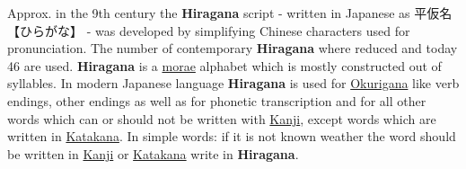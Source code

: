 Approx. in the 9th century the \textbf{Hiragana} script - written in Japanese
as {平仮名} {【ひらがな】} - was developed by simplifying Chinese characters
used for pronunciation. The number of contemporary \textbf{Hiragana} where
reduced and today 46 are used.  \textbf{Hiragana} is a
\hyperref[sec:Mora]{morae} alphabet which is mostly constructed out of
syllables. In modern Japanese language \textbf{Hiragana} is used for
\hyperref[sec:Okurigana]{Okurigana} like  verb endings, other endings as well
as for phonetic transcription and for all other words which can or should not
be written with \hyperref[sec:Kanji]{Kanji}, except words which are written in
\hyperref[sec:Katakana]{Katakana}. In simple words: if it is not known weather
the word should be written in \hyperref[sec:Kanji]{Kanji} or
\hyperref[sec:Katakana]{Katakana} write in \textbf{Hiragana}.
